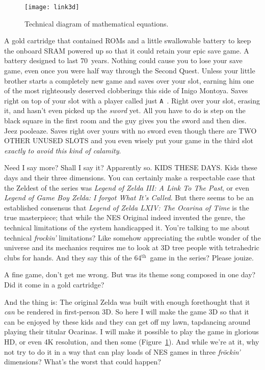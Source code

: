 \documentclass[twocolumn]{article}
\renewcommand\th{$^{\mathrm{th}}$}
\begin{document}
\begin{figure}[h!t]
\begin{center}
\texttt{[image: link3d]}
\end{center}\vspace{-0.1in}
\caption{Technical diagram of mathematical equations.} \label{fig:link3d}
\end{figure}


A gold cartridge that contained ROMs and a little swallowable battery
to keep the onboard SRAM powered up so that it could retain your epic
save game. A battery designed to last 70~years. Nothing could cause
you to lose your save game, even once you were half way through the
Second Quest. Unless your little brother starts a completely new game
and saves over your slot, earning him one of the most righteously
deserved clobberings this side of Inigo Montoya. Saves right on top of
your slot with a player called just \verb+A +. Right over your slot,
erasing it, and hasn't even picked up the {\it sword} yet. All you
have to do is step on the black square in the first room and the guy
gives you the sword and then dies. Jeez pooleaze. Saves right over
yours with no sword even though there are TWO OTHER UNUSED SLOTS and
you even wisely put your game in the third slot {\it exactly to avoid
  this kind of calamity}.

\medskip
Need I say more? Shall I say it? Apparently so. KIDS THESE DAYS. Kids
these days and their three dimensions. You can certainly make a
respectable case that the Zeldest of the series was {\it Legend of
  Zelda III: A Link To The Past}, or even {\it Legend of Game Boy
  Zelda: I forgot What It's Called}. But there seems to be an
established consensus that {\it Legend of Zelda LXIV: The Ocarina of
  Time} is the true masterpiece; that while the NES Original indeed
invented the genre, the technical limitations of the system
handicapped it. You're talking to me about technical {\it frockin'}
limitations? Like somehow appreciating the subtle wonder of the
universe and its mechanics requires me to look at 3D tree people with
tetrahedric clubs for hands. And they say this of the 64\th\ game in
the series? Please jouize.

A fine game, don't get me wrong. But was its theme song composed in
one day? Did it come in a gold cartridge?

And the thing is: The original Zelda was built with enough forethought
that it {\em can} be rendered in first-person 3D. So here I will make
the game 3D so that it can be enjoyed by these kids and they can get
off my lawn, tapdancing around playing their titular Ocarinas. I will
make it possible to play the game in glorious HD, or even 4K
resolution, and then some (Figure~\ref{fig:link3d}). And while
we're at it, why not try to do it in a way that can play loads of NES
games in three {\it fr\"ockin'} dimensions? What's the worst that
could happen?
\end{document}
